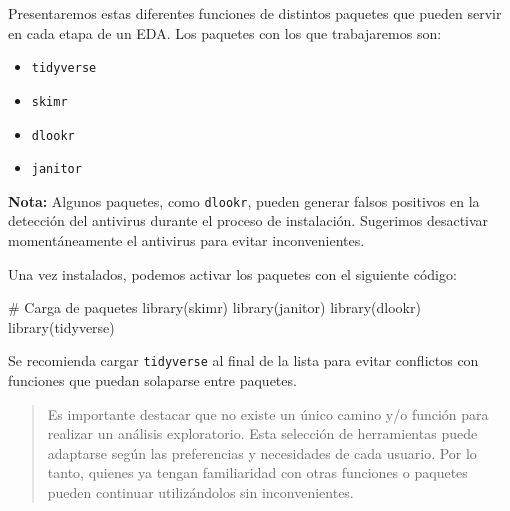 \documentclass[
  spanish,
  letterpaper,
  DIV=11,
  numbers=noendperiod]{scrreprt}
\newenvironment{Shaded}{\begin{snugshade}}{\end{snugshade}}
\newcommand{\CommentTok}[1]{\textcolor[rgb]{0.37,0.37,0.37}{#1}}
\newcommand{\FunctionTok}[1]{\textcolor[rgb]{0.28,0.35,0.67}{#1}}
\newcommand{\NormalTok}[1]{\textcolor[rgb]{0.00,0.23,0.31}{#1}}
\providecommand{\tightlist}{%
  \setlength{\itemsep}{0pt}\setlength{\parskip}{0pt}}
\begin{document}
Presentaremos estas diferentes funciones de distintos paquetes que
pueden servir en cada etapa de un EDA. Los paquetes con los que
trabajaremos son:

\begin{itemize}
\tightlist
\item
  \texttt{tidyverse}
\item
  \texttt{skimr}
\item
  \texttt{dlookr}
\item
  \texttt{janitor}
\end{itemize}

\begin{tcolorbox}[enhanced jigsaw, arc=.35mm, bottomrule=.15mm, breakable, colback=white, colframe=quarto-callout-warning-color-frame, left=2mm, leftrule=.75mm, opacityback=0, rightrule=.15mm, toprule=.15mm]
\begin{minipage}[t]{5.5mm}
\textcolor{quarto-callout-warning-color}{\faExclamationTriangle}
\end{minipage}%
\begin{minipage}[t]{\textwidth - 5.5mm}

\textbf{Nota:} Algunos paquetes, como \texttt{dlookr}, pueden generar
falsos positivos en la detección del antivirus durante el proceso de
instalación. Sugerimos desactivar momentáneamente el antivirus para
evitar inconvenientes.

\end{minipage}%
\end{tcolorbox}

Una vez instalados, podemos activar los paquetes con el siguiente
código:

\begin{Shaded}
\begin{Highlighting}[]
\CommentTok{\# Carga de paquetes}
\FunctionTok{library}\NormalTok{(skimr)}
\FunctionTok{library}\NormalTok{(janitor)}
\FunctionTok{library}\NormalTok{(dlookr)}
\FunctionTok{library}\NormalTok{(tidyverse)}
\end{Highlighting}
\end{Shaded}

Se recomienda cargar \texttt{tidyverse} al final de la lista para evitar
conflictos con funciones que puedan solaparse entre paquetes.

\begin{quote}
Es importante destacar que no existe un único camino y/o función para
realizar un análisis exploratorio. Esta selección de herramientas puede
adaptarse según las preferencias y necesidades de cada usuario. Por lo
tanto, quienes ya tengan familiaridad con otras funciones o paquetes
pueden continuar utilizándolos sin inconvenientes.
\end{quote}
\end{document}

